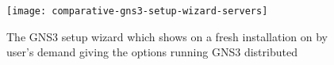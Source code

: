 \begin{figure}
  \centering
  \texttt{[image: comparative-gns3-setup-wizard-servers]}
  \caption{The GNS3 setup wizard which shows on a fresh installation on by user's demand giving the options running GNS3 distributed}
  \label{fig:comparative-gns3-setup-wizard-servers}
\end{figure}
